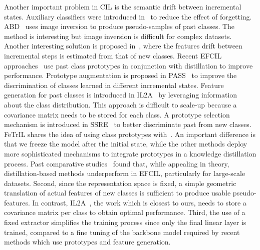 \documentclass[10pt,twocolumn,letterpaper]{article}
\makeatletter
\newcommand{\ourmodel}{FeTrIL\@\xspace}
\makeatother
\begin{document}
Another important problem in CIL is the semantic drift between incremental states.
Auxiliary classifiers were introduced in~\cite{liu2020more} to reduce the effect of forgetting.
ABD~\cite{smith2021always} uses image inversion to produce pseudo-samples of past classes.
The method is interesting but image inversion is difficult for complex datasets.
Another interesting solution is proposed in~\cite{sdc_2020}, where the features drift between incremental steps is estimated from that of new classes.
Recent EFCIL approaches~\cite{zhu2021class,zhu2021pass,zhu2022self} use past class prototypes in conjunction with distillation to improve performance. 
Prototype augmentation is proposed in PASS~\cite{zhu2021pass} to improve the discrimination of classes learned in different incremental states.  
Feature generation for past classes is introduced in IL2A~\cite{zhu2021class} by leveraging information about the class distribution.
This approach is difficult to scale-up because a covariance matrix needs to be stored for each class.
A prototype selection mechanism is introduced in SSRE~\cite{zhu2022self} to better discriminate past from new classes. 
\ourmodel shares the idea of using class prototypes with~\cite{sdc_2020,zhu2021class,zhu2021pass,zhu2022self}.
An important difference is that we freeze the model after the initial state, while the other methods deploy more sophisticated mechanisms to integrate prototypes in a knowledge distillation process.
Past comparative studies~\cite{belouadah2021_study,masana2021_study} found that, while appealing in theory, distillation-based methods underperform in EFCIL, particularly for large-scale datasets. 
Second, since the representation space is fixed, a simple geometric translation of actual features of new classes is sufficient to produce usable pseudo-features.
In contrast, IL2A~\cite{zhu2021class}, the work which is closest to ours, needs to store a covariance matrix per class to obtain optimal performance. 
Third, the use of a fixed extractor simplifies the training process since only the final linear layer is trained, compared to a fine tuning of the backbone model required by recent methods which use prototypes and feature generation. 
\end{document}
